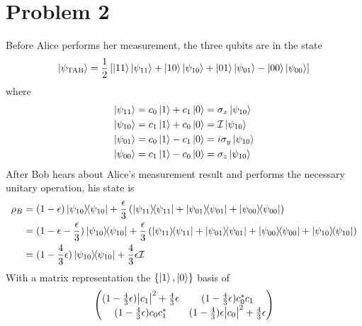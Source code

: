 \documentclass[12pt]{article}
\newcommand{\magsq}[1]{\big|#1\big|^2}
\begin{document}
\section*{Problem 2}
Before Alice performs her measurement, the three qubits are in the state
\[ \ket{\psi_{\text{TAB}}} = \frac{1}{2}\left[\ket{1 1}\ket{\psi_{11}} + \ket{1 0}\ket{\psi_{10}} + \ket{01}\ket{\psi_{01}} - \ket{00}\ket{\psi_{00}}\right] \]
where
\begin{align*}
    \ket{\psi_{11}} &= c_0\ket{1} + c_1\ket{0} = \sigma_x\ket{\psi_{10}} \\
    \ket{\psi_{10}} &= c_1\ket{1} + c_0\ket{0} = \mathcal{I}\ket{\psi_{10}} \\
    \ket{\psi_{01}} &= c_0\ket{1} - c_1\ket{0} = i\sigma_y\ket{\psi_{10}} \\
    \ket{\psi_{00}} &= c_1\ket{1} - c_0\ket{0} = \sigma_z\ket{\psi_{10}}
\end{align*}
After Bob hears about Alice's measurement result and performs the necessary unitary operation, his state is
\begin{align*}
    \rho_B &= (1-\epsilon)\dyad{\psi_{10}} + \frac{\epsilon}{3}\left(\dyad{\psi_{11}} + \dyad{\psi_{01}} + \dyad{\psi_{00}} \right) \\
    &= (1-\epsilon - \frac{\epsilon}{3})\dyad{\psi_{10}} + \frac{\epsilon}{3}\left(\dyad{\psi_{11}} + \dyad{\psi_{01}} + \dyad{\psi_{00}} + \dyad{\psi_{10}} \right) \\
    &= (1 - \frac{4}{3}\epsilon)\dyad{\psi_{10}} + \frac{4}{3}\epsilon\mathcal{I}
\end{align*}
With a matrix representation the $\{\ket{1}, \ket{0}\}$ basis of
\[ \mqty((1 - \frac{4}{3}\epsilon)\magsq{c_1} + \frac{4}{3}\epsilon & (1-\frac{4}{3}\epsilon)c_0^*c_1 \\ (1-\frac{4}{3}\epsilon)c_0c_1^* & (1 - \frac{4}{3})\epsilon\magsq{c_0} + \frac{4}{3}\epsilon ) \]
\end{document}
